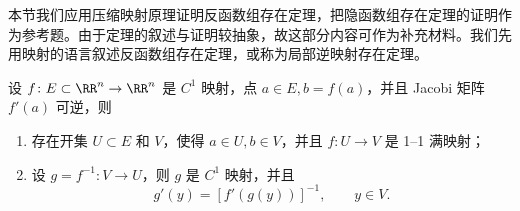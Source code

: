 本节我们应用压缩映射原理证明反函数组存在定理，把隐函数组存在定理的证明作为参考题。由于定理的叙述与证明较抽象，故这部分内容可作为补充材料。我们先用映射的语言叙述反函数组存在定理，或称为局部逆映射存在定理。

\begin{xproposition}[20.2.3（局部逆映射存在定理）]
设 $f\colon E\subset\RR^n\to\RR^n$ 是 $C^1$ 映射，点 $a\in E,b=f(a)$，并且 Jacobi 矩阵 $f'(a)$ 可逆，则
\begin{enumerate}[label=(\arabic*)]
  \item 存在开集 $U\subset E$ 和 $V$，使得 $a\in U,b\in V$，并且 $f\colon U\to V$ 是 1--1 满映射；
  \item 设 $g=f^{-1}\colon V\to U$，则 $g$ 是 $C^1$ 映射，并且
  \[
    g'(y)=[f'(g(y))]^{-1},\qquad y\in V.
  \]
\end{enumerate}
\end{xproposition}
